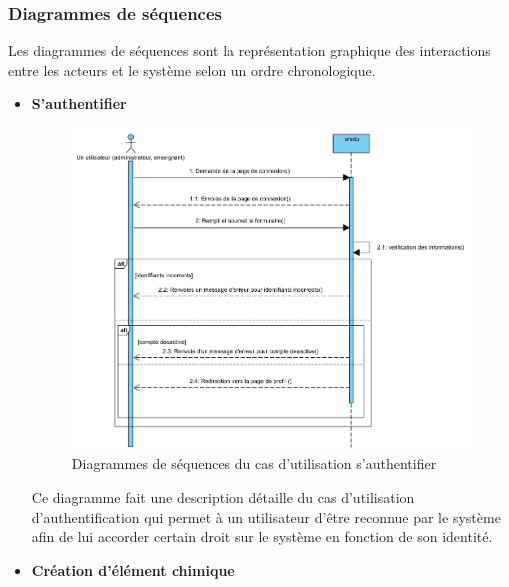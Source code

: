 \subsubsection{Diagrammes de séquences}

Les diagrammes de séquences sont la représentation graphique des interactions entre les acteurs et le système selon un ordre chronologique. 

\begin{itemize}
	\item \textbf{S’authentifier}

	\begin{figure}[H]
		\centering
		\includegraphics[width=1\textwidth]{img/ucdAuth}
		\caption{Diagrammes de séquences du cas d'utilisation s’authentifier}
		\label{fig:mesh1}
	\end{figure}

	Ce diagramme fait une description détaille du cas d’utilisation d’authentification qui permet à un utilisateur d’être reconnue par le système afin de lui accorder certain droit sur le système en fonction de son identité. 


	\item \textbf{Création d’élément chimique}


\end{itemize}
